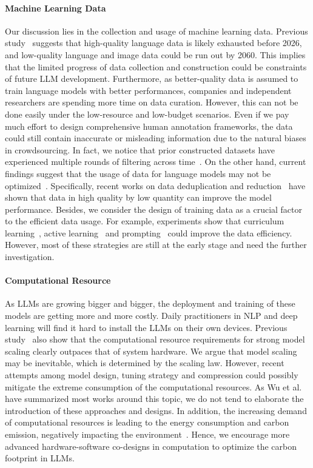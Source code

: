 \paragraph{Machine Learning Data}
Our discussion lies in the collection and usage of machine learning data. Previous study~\cite{villalobos2022will} suggests that high-quality language data is likely exhausted before 2026, and low-quality language and image data could be run out by 2060. This implies that the limited progress of data collection and construction could be constraints of future LLM development. Furthermore, as better-quality data is assumed to train language models with better performances, companies and independent researchers are spending more time on data curation. However, this can not be done easily under the low-resource and low-budget scenarios. Even if we pay much effort to design comprehensive human annotation frameworks, the data could still contain inaccurate or misleading information due to the natural biases in crowdsourcing. In fact, we notice that prior constructed datasets have experienced multiple rounds of filtering across time~\cite{northcutt2021confident}. On the other hand, current findings suggest that the usage of data for language models may not be optimized~\cite{treviso2022efficient}. Specifically, recent works on data deduplication and reduction~\cite{mishra2020we,lee2022deduplicating} have shown that data in high quality by low quantity can improve the model performance. Besides, we consider the design of training data as a crucial factor to the efficient data usage. For example, experiments show that curriculum learning~\cite{Bengio2009CurriculumL}, active learning~\cite{Ren2020ASO} and prompting~\cite{Brown2020LanguageMA} could improve the data efficiency. However, most of these strategies are still at the early stage and need the further investigation.

\paragraph{Computational Resource}
As LLMs are growing bigger and bigger, the deployment and training of these models are getting more and more costly. Daily practitioners in NLP and deep learning will find it hard to install the LLMs on their own devices. Previous study~\cite{thompson2020computational} also show that the computational resource requirements for strong model scaling clearly outpaces that of
system hardware. We argue that model scaling may be inevitable, which is determined by the scaling law. However, recent attempts among model design, tuning strategy and compression could possibly mitigate the extreme consumption of the computational resources. As Wu et al.~\cite{wu2022sustainable} have summarized most works around this topic, we do not tend to elaborate the introduction of these approaches and designs. In addition, the increasing demand of computational resources is leading to the energy consumption and carbon emission, negatively impacting the environment~\cite{wu2022sustainable}. Hence, we encourage more advanced hardware-software co-designs in computation to optimize the carbon footprint in LLMs.


